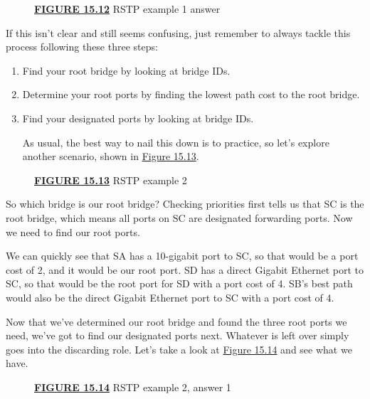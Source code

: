 \begin{figure}
\centering
\caption{{\protect\hyperlink{c15.xhtmlux5cux23figureanchor15-12}{\textbf{FIGURE
15.12}} RSTP example 1 answer}}
\end{figure}

If this isn't clear and still seems confusing, just remember to always
tackle this process following these three steps:

\begin{enumerate}
\item
  Find your root bridge by looking at bridge IDs.
\item
  Determine your root ports by finding the lowest path cost to the root
  bridge.
\item
  Find your designated ports by looking at bridge IDs.

  As usual, the best way to nail this down is to practice, so let's
  explore another scenario, shown in
  \protect\hyperlink{c15.xhtmlux5cux23figure15-13}{Figure 15.13}.
\end{enumerate}



\begin{figure}
\centering
\caption{{\protect\hyperlink{c15.xhtmlux5cux23figureanchor15-13}{\textbf{FIGURE
15.13}} RSTP example 2}}
\end{figure}

So which bridge is our root bridge? Checking priorities first tells us
that SC is the root bridge, which means all ports on SC are designated
forwarding ports. Now we need to find our root ports.

We can quickly see that SA has a 10-gigabit port to SC, so that would be
a port cost of 2, and it would be our root port. SD has a direct Gigabit
Ethernet port to SC, so that would be the root port for SD with a port
cost of 4. SB's best path would also be the direct Gigabit Ethernet port
to SC with a port cost of 4.

Now that we've determined our root bridge and found the three root ports
we need, we've got to find our designated ports next. Whatever is left
over simply goes into the discarding role. Let's take a look at
\protect\hyperlink{c15.xhtmlux5cux23figure15-14}{Figure 15.14} and see
what we have.

\begin{figure}
\centering
\caption{{\protect\hyperlink{c15.xhtmlux5cux23figureanchor15-14}{\textbf{FIGURE
15.14}} RSTP example 2, answer 1}}
\end{figure}


